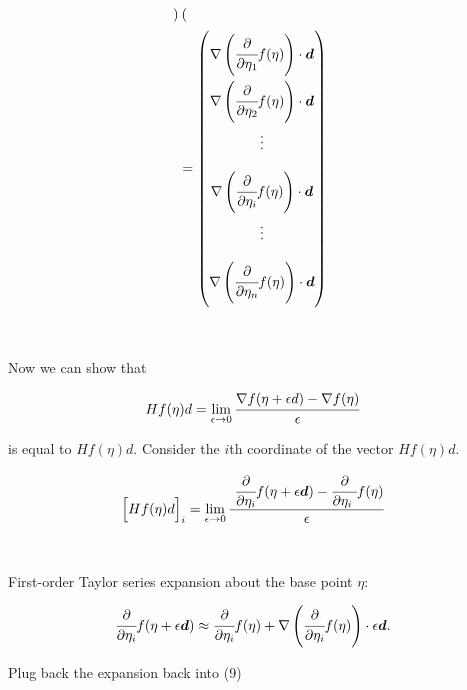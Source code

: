\documentclass[]{article}
\begin{document}
\begin{itemize}
\begin{align}
\begin{pmatrix}
     \end{pmatrix} \\
     &= \begin{pmatrix} 
    \\[-.85em]
   \nabla   \left( \cfrac{\partial }{\partial \eta_1 }  f(\eta) \right) \cdot {\bm d} \\[1.25em]
    \nabla   \left( \cfrac{\partial }{\partial \eta_2 }  f(\eta) \right) \cdot {\bm d} \\[1.25em]
    \vdots \\[1.25em]
    \nabla   \left( \cfrac{\partial }{\partial \eta_i }  f(\eta) \right) \cdot {\bm d} \\[1.25em]
    \vdots \\[1.25em]
    \nabla   \left( \cfrac{\partial }{\partial \eta_n }  f(\eta) \right) \cdot {\bm d} \\[1.25em]
    \end{pmatrix} 
 \end{align}


\ 

Now we can show that

\begin{align*}
     Hf(\eta)d &= \lim_{\epsilon \rightarrow 0} \cfrac{\nabla f(\eta + \epsilon d) - \nabla f(\eta)}{\epsilon} 
 \end{align*}
 
is equal to $Hf(\eta)d$.  Consider the $i$th coordinate of the vector $Hf(\eta)d$.
 
   \begin{align}
     \Big[Hf(\eta)d\Big]_i &= 
     \lim_{\epsilon \rightarrow 0} \cfrac{ \ \cfrac{\partial }{\partial \eta_i }  f(\eta + \epsilon {\bm d}) -   \cfrac{\partial }{\partial \eta_i \ }   f(\eta)}{\epsilon}   
     \end{align}
      
\

First-order Taylor series expansion about the base point $\eta$:
 
 \begin{align*}
     \cfrac{\partial }{\partial \eta_i }  f(\eta + \epsilon {\bm d}) &\approx \cfrac{\partial }{\partial \eta_i }  f(\eta) + \nabla 
     \left( \cfrac{\partial }{\partial \eta_i }  f(\eta) \right) \cdot \epsilon {\bm d}. 
 \end{align*}
 
 Plug back the expansion back into (9)
 

\end{itemize}
\end{document}
